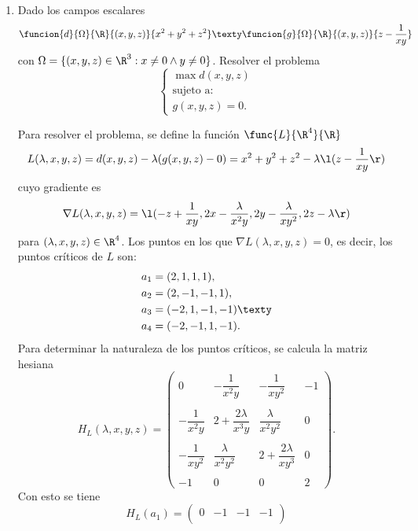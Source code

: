 \documentclass[a4,11pt]{aleph-examen}
\begin{document}
\begin{preguntas}
\begin{respuesta}
\begin{respuesta}
\begin{respuesta}
\begin{enumerate}
\item 
    Dado los campos escalares
    \[
        \funcion{d}{\Omega}{\R}{(x,y,z)}{x^2+y^2+z^2} \texty \funcion{g}{\Omega}{\R}{(x,y,z)}{z-\dfrac{1}{xy}}
    \]
    con $\Omega=\lbrace (x,y,z)\in\R^3:x\neq 0 \land y\neq 0 \rbrace$. Resolver el problema
    \[
        \begin{cases}
            \max d(x,y,z)\\
            \text{sujeto  a:}\\
            g(x,y,z)=0.
        \end {cases}
    \]
    
\begin{respuesta}
    Para resolver el problema, se define la función $\func{L}{\R^4}{\R}$
    \[
        L(\lambda,x,y,z)=d(x,y,z)-\lambda(g(x,y,z)-0)=x^2+y^2+z^2-\lambda \l(z-\dfrac{1}{xy}\r)
    \]
    cuyo gradiente es
    \[
        \nabla L(\lambda,x,y,z)=\l(-z+\dfrac{1}{xy},2x-\dfrac{\lambda}{x^2y},2y-\dfrac{\lambda}{xy^2},2z-\lambda \r)
    \]
    para $(\lambda,x,y,z)\in\R^4$. Los puntos en los que $\nabla L(\lambda,x,y,z)=0$, es decir, los puntos críticos de $L$ son:
    \begin{align*}
        a_1&=(2,1,1,1),\\
        a_2&=(2,-1,-1,1),\\ 
        a_3&=(-2,1,-1,-1) \texty \\ 
        a_4&=(-2,-1,1,-1).
    \end{align*}
    Para determinar la naturaleza de los puntos críticos, se calcula la matriz hesiana
    \[
            H_L(\lambda,x,y,z) = 
            \begin{pmatrix}
                0 & -\dfrac{1}{x^2y} & -\dfrac{1}{xy^2} & -1\\ \\
                -\dfrac{1}{x^2y} & 2+\dfrac{2\lambda}{x^3y} & \dfrac{\lambda}{x^2y^2} & 0\\ \\
                -\dfrac{1}{xy^2} & \dfrac{\lambda}{x^2y^2} & 2+\dfrac{2\lambda}{xy^3} & 0\\ \\
                -1 & 0 & 0 & 2
            \end{pmatrix}.
    \]
    Con esto se tiene
    \[
        H_L(a_1)=
        \begin{pmatrix}
            0 & -1 & -1 & -1\\

\end{pmatrix}\]
\end{respuesta}
\end{enumerate}
\end{respuesta}
\end{respuesta}
\end{respuesta}
\end{preguntas}
\end{document}
